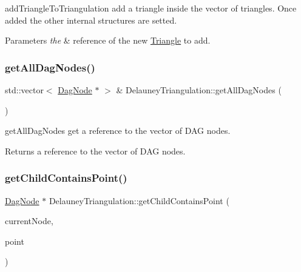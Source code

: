 add\+Triangle\+To\+Triangulation add a triangle inside the vector of triangles. Once added the other internal structures are setted. 


\begin{DoxyParams}{Parameters}
{\em the} & reference of the new \hyperlink{classTriangle}{Triangle} to add. \\
\hline
\end{DoxyParams}
\mbox{\label{classDelauneyTriangulation_a3f0c51faef713227596d9b54bddcd0a7}} 
\subsubsection{\texorpdfstring{get\+All\+Dag\+Nodes()}{getAllDagNodes()}}
{\footnotesize\ttfamily std\+::vector$<$ \hyperlink{classDagNode}{Dag\+Node} $\ast$ $>$ \& Delauney\+Triangulation\+::get\+All\+Dag\+Nodes (\begin{DoxyParamCaption}{ }\end{DoxyParamCaption})\hspace{0.3cm}{\ttfamily [inline]}}



get\+All\+Dag\+Nodes get a reference to the vector of D\+AG nodes. 

\begin{DoxyReturn}{Returns}
a reference to the vector of D\+AG nodes. 
\end{DoxyReturn}
\mbox{\label{classDelauneyTriangulation_a40358f651aade3605321bfdee412ffc8}} 
\subsubsection{\texorpdfstring{get\+Child\+Contains\+Point()}{getChildContainsPoint()}}
{\footnotesize\ttfamily \hyperlink{classDagNode}{Dag\+Node} $\ast$ Delauney\+Triangulation\+::get\+Child\+Contains\+Point (\begin{DoxyParamCaption}\item[{\hyperlink{classDagNode}{Dag\+Node} $\ast$\&}]{current\+Node,  }\item[{const cg3\+::\+Point2\+Dd \&}]{point }\end{DoxyParamCaption})}



